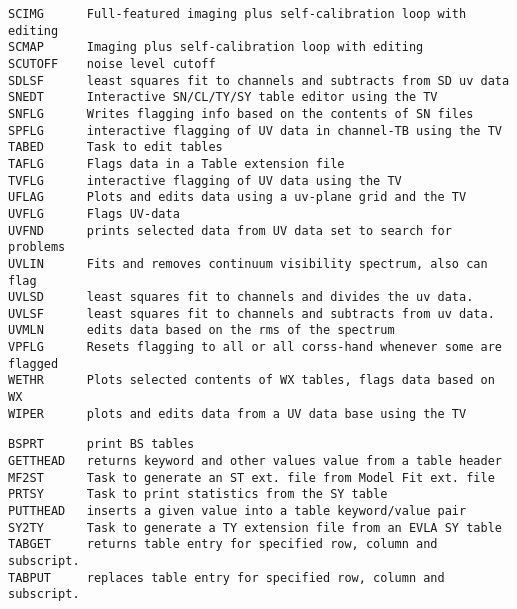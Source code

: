 \begin{verbatim}
SCIMG      Full-featured imaging plus self-calibration loop with editing
SCMAP      Imaging plus self-calibration loop with editing
SCUTOFF    noise level cutoff
SDLSF      least squares fit to channels and subtracts from SD uv data
SNEDT      Interactive SN/CL/TY/SY table editor using the TV
SNFLG      Writes flagging info based on the contents of SN files
SPFLG      interactive flagging of UV data in channel-TB using the TV
TABED      Task to edit tables
TAFLG      Flags data in a Table extension file
TVFLG      interactive flagging of UV data using the TV
UFLAG      Plots and edits data using a uv-plane grid and the TV
UVFLG      Flags UV-data
UVFND      prints selected data from UV data set to search for problems
UVLIN      Fits and removes continuum visibility spectrum, also can flag
UVLSD      least squares fit to channels and divides the uv data.
UVLSF      least squares fit to channels and subtracts from uv data.
UVMLN      edits data based on the rms of the spectrum
VPFLG      Resets flagging to all or all corss-hand whenever some are flagged
WETHR      Plots selected contents of WX tables, flags data based on WX
WIPER      plots and edits data from a UV data base using the TV
\end{verbatim}\eve


\vskip 0.5pt
\bbve\begin{verbatim}
BSPRT      print BS tables
GETTHEAD   returns keyword and other values value from a table header
MF2ST      Task to generate an ST ext. file from Model Fit ext. file
PRTSY      Task to print statistics from the SY table
PUTTHEAD   inserts a given value into a table keyword/value pair
SY2TY      Task to generate a TY extension file from an EVLA SY table
TABGET     returns table entry for specified row, column and subscript.
TABPUT     replaces table entry for specified row, column and subscript.
\end{verbatim}\eve


